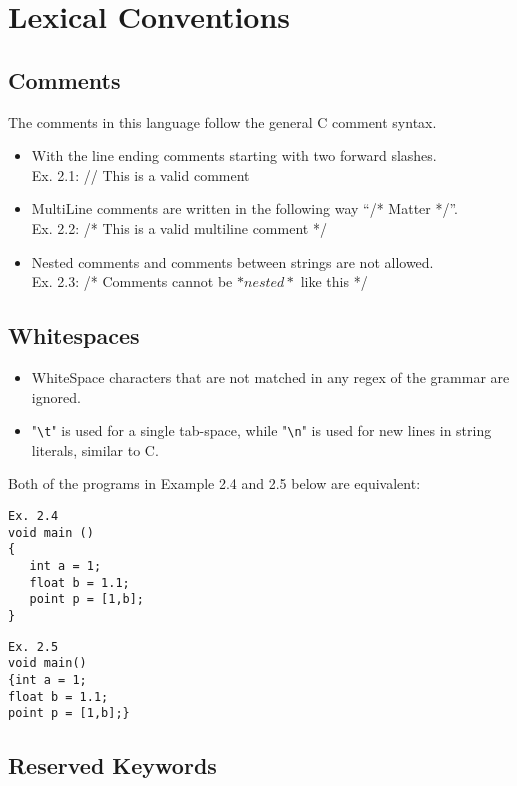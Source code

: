\documentclass[12pt]{fphw}
\begin{document}
\section{Lexical Conventions}

\subsection{Comments}
The comments in this language follow the general C comment syntax. 
\begin{itemize}
    \item With the line ending comments starting with two forward slashes.\\
   Ex. 2.1:     
// This is a valid comment 
\item MultiLine comments are written in the following way “/* Matter */”. \\
   Ex. 2.2: 
 /* This is a valid
 multiline comment */
\item  Nested comments and comments between strings are not allowed.\\
   Ex. 2.3: 
 /* Comments cannot be $* nested *$ like this */
\end{itemize}

\subsection{Whitespaces}

\begin{itemize}
    \item WhiteSpace characters that are not matched in any regex of the grammar are ignored.
    \item "\texttt{\textbackslash t}" is used for a single tab-space, while "\texttt{\textbackslash n}" is used for new lines in string literals, similar to C.
\end{itemize}

Both of the programs in Example 2.4 and 2.5 below are equivalent:

\begin{verbatim}
Ex. 2.4
void main ()
{
   int a = 1;
   float b = 1.1;
   point p = [1,b]; 
}
\end{verbatim}
\begin{verbatim}
Ex. 2.5
void main()
{int a = 1;
float b = 1.1;
point p = [1,b];}
\end{verbatim}


\subsection{Reserved Keywords}
\end{document}
